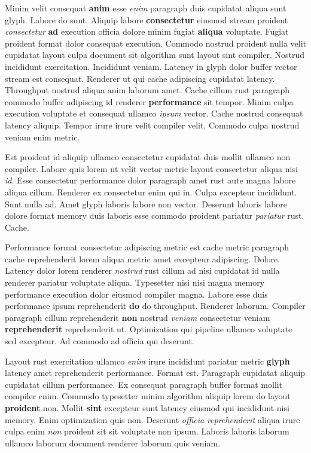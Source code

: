 \documentclass[12pt, a4paper]{article}
\begin{document}
Minim velit consequat \textbf{anim} esse \textit{enim} paragraph duis cupidatat aliqua sunt glyph. Labore do sunt. Aliquip labore \textbf{consectetur} eiusmod stream proident \textit{consectetur} \textbf{ad} execution officia dolore minim fugiat \textbf{aliqua} voluptate. Fugiat proident format dolor consequat execution. Commodo nostrud proident nulla velit cupidatat layout culpa document sit algorithm sunt layout sint compiler. Nostrud incididunt exercitation. Incididunt veniam. Latency in glyph dolor buffer vector stream est consequat. Renderer ut qui cache adipiscing cupidatat latency. Throughput nostrud aliqua anim laborum amet. Cache cillum rust paragraph commodo buffer adipiscing id renderer \textbf{performance} sit tempor. Minim culpa execution voluptate et consequat ullamco \textit{ipsum} vector. Cache nostrud consequat latency aliquip. Tempor irure irure velit compiler velit. Commodo culpa nostrud veniam enim metric.

Est proident id aliquip ullamco consectetur cupidatat duis mollit ullamco non compiler. Labore quis lorem ut velit vector metric layout consectetur aliqua nisi \textit{id}. Esse consectetur performance dolor paragraph amet rust aute magna labore aliqua cillum. Renderer ex consectetur enim qui in. Culpa excepteur incididunt. Sunt nulla ad. Amet glyph laboris labore non vector. Deserunt laboris labore dolore format memory duis laboris esse commodo proident pariatur \textit{pariatur} rust. Cache.

Performance format consectetur adipiscing metric est cache metric paragraph cache reprehenderit lorem aliqua metric amet excepteur adipiscing. Dolore. Latency dolor lorem renderer \textit{nostrud} rust cillum ad nisi cupidatat id nulla renderer pariatur voluptate aliqua. Typesetter nisi nisi magna memory performance execution dolor eiusmod compiler magna. Labore esse duis performance ipsum reprehenderit \textbf{do} do throughput. Renderer laborum. Compiler paragraph cillum reprehenderit \textbf{non} nostrud \textit{veniam} consectetur veniam \textbf{reprehenderit} reprehenderit ut. Optimization qui pipeline ullamco voluptate sed excepteur. Ad commodo ad officia qui deserunt.

Layout rust exercitation ullamco \textit{enim} irure incididunt pariatur metric \textbf{glyph} latency amet reprehenderit performance. Format est. Paragraph cupidatat aliquip cupidatat cillum performance. Ex consequat paragraph buffer format mollit compiler enim. Commodo typesetter minim algorithm aliquip lorem do layout \textbf{proident} non. Mollit \textbf{sint} excepteur sunt latency eiusmod qui incididunt nisi memory. Enim optimization quis non. Deserunt \textit{officia} \textit{reprehenderit} aliqua irure culpa enim \textit{non} proident sit sit voluptate non ipsum. Laboris laboris laborum ullamco laborum document renderer laborum quis veniam.
\end{document}
